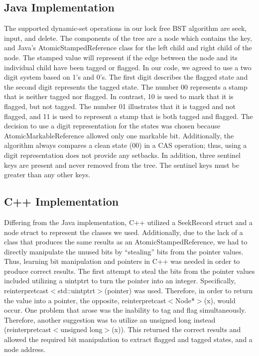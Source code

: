 \documentclass[conference]{IEEEtran}
\begin{document}
\subsection{Java Implementation}\label{AA}
The supported dynamic-set operations in our lock free BST algorithm are seek, input, and delete. The components of the tree are a node which contains the key, and Java’s AtomicStampedReference class for the left child and right child of the node. The stamped value will represent if the edge between the node and its individual child have been tagged or flagged. In our code, we agreed to use a two digit system based on 1’s and 0’s. The first digit describes the flagged state and the second digit represents the tagged state. The number 00 represents a stamp that is neither tagged nor flagged. In contrast, 10 is used to mark that it is flagged, but not tagged. The number 01 illustrates that it is tagged and not flagged, and 11 is used to represent a stamp that is both tagged and flagged. The decision to use a digit representation for the states was chosen because AtomicMarkableReference allowed only one markable bit. Additionally, the algorithm always compares a clean state (00) in a CAS operation; thus, using a digit representation does not provide any setbacks. In addition, three sentinel keys are present and never removed from the tree. The sentinel keys must be greater than any other keys.

\subsection{C++ Implementation}\label{AA}
Differing from the Java implementation, C++ utilized a SeekRecord struct and a node struct to represent the classes we used. Additionally, due to the lack of a class that produces the same results as an AtomicStampedReference, we had to directly manipulate the unused bits by “stealing” bits from the pointer values. Thus, learning bit manipulation and pointers in C++ was needed in order to produce correct results. The first attempt to steal the bits from the pointer values included utilizing a uintptr\textunderscore t to turn the pointer into an integer. Specifically, reinterpret\textunderscore cast$<$std::uintptr\textunderscore t$>$(pointer) was used. Therefore, in order to return the value into a pointer, the opposite, reinterpret\textunderscore cast$<$Node*$>$(x), would occur. One problem that arose was the inability to tag and flag simultaneously. Therefore, another suggestion was to utilize an unsigned long instead (reinterpret\textunderscore cast$<$unsigned long$>$(x)). This returned the correct results and allowed the required bit manipulation to extract flagged and tagged states, and a node address. 
\end{document}
